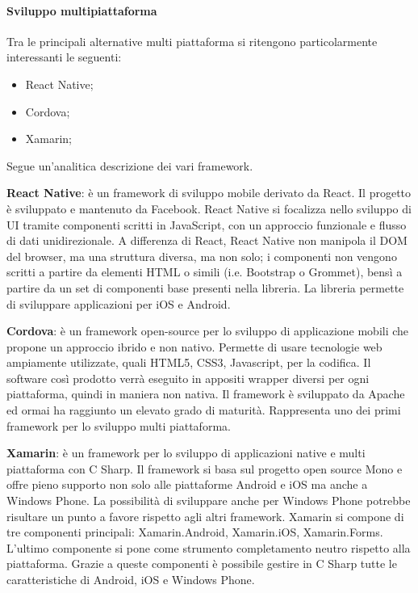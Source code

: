 \paragraph{Sviluppo multipiattaforma}
Tra le principali alternative multi piattaforma si ritengono particolarmente interessanti le seguenti:
\begin{itemize}
    \item React Native;
    \item Cordova;
    \item Xamarin;
\end{itemize}
Segue un’analitica descrizione dei vari framework.

\textbf{React Native}: è un framework di sviluppo mobile derivato da React. Il progetto è sviluppato e mantenuto da Facebook. React Native si focalizza nello sviluppo di UI tramite componenti scritti in JavaScript, con un approccio funzionale e flusso di dati unidirezionale.  A differenza di React, React Native non manipola il DOM del browser, ma una struttura diversa, ma non solo; i componenti non vengono scritti a partire da elementi HTML o simili (i.e. Bootstrap o Grommet),  bensì a partire da un set di componenti base presenti nella libreria. La libreria permette di sviluppare applicazioni per iOS e Android.

\textbf{Cordova}: è un framework open-source per lo sviluppo di applicazione mobili che propone un approccio ibrido e non nativo. Permette di usare tecnologie web ampiamente utilizzate, quali HTML5, CSS3, Javascript, per la codifica. Il software così prodotto verrà eseguito in appositi wrapper diversi per ogni piattaforma, quindi in maniera non nativa. Il framework è sviluppato da Apache ed ormai ha raggiunto un elevato grado di maturità. Rappresenta uno dei primi framework per lo sviluppo multi piattaforma.

\textbf{Xamarin}: è un framework per lo sviluppo di applicazioni native e multi piattaforma con C Sharp. Il framework si basa sul progetto open source Mono e offre pieno supporto non solo alle piattaforme Android e iOS ma anche a Windows Phone. La possibilità di sviluppare anche per Windows Phone potrebbe risultare un punto a favore rispetto agli altri framework. Xamarin si compone di tre componenti principali: Xamarin.Android, Xamarin.iOS, Xamarin.Forms. L’ultimo componente si pone come strumento completamento neutro rispetto alla piattaforma. Grazie a queste componenti è possibile gestire in C Sharp tutte le caratteristiche di Android, iOS e Windows Phone.
\medskip

